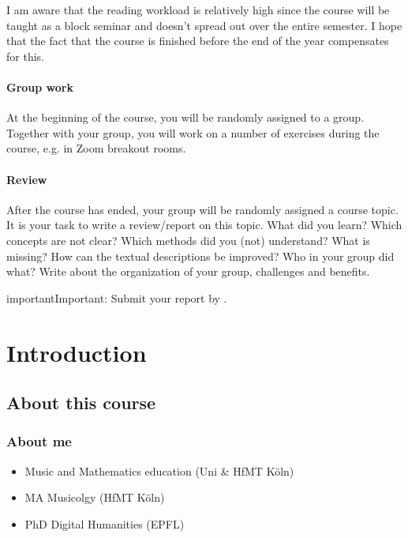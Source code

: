 \documentclass[letterpaper,10pt,english]{sphinxmanual}
\begin{document}
I am aware that the reading workload is relatively high since the course will be taught as a block seminar
and doesn’t spread out over the entire semester. I hope that the fact that the course is finished before the
end of the year compensates for this.
\subsubsection*{Group work}

At the beginning of the course, you will be randomly assigned to a group.
Together with your group, you will work on a number of exercises during the course,
e.g. in Zoom breakout rooms.
\subsubsection*{Review}

After the course has ended, your group will be randomly assigned a course topic.
It is your task to write a review/report on this topic.
What did you learn? Which concepts are not clear? Which methods did you (not) understand?
What is missing? How can the textual descriptions be improved? Who in your group did what?
Write about the organization of your group, challenges and benefits.

\begin{sphinxadmonition}{important}{Important:}
Submit your report by .
\end{sphinxadmonition}


\chapter{Introduction}
\label{\detokenize{2_introduction:introduction}}\label{\detokenize{2_introduction::doc}}


\section{About this course}
\label{\detokenize{2_introduction:about-this-course}}

\subsection{About me}
\label{\detokenize{2_introduction:about-me}}\begin{itemize}
\item {} 
Music and Mathematics education (Uni \& HfMT Köln)

\item {} 
MA Musicolgy (HfMT Köln)

\item {} 
PhD Digital Humanities (EPFL)

\end{itemize}
\end{document}
